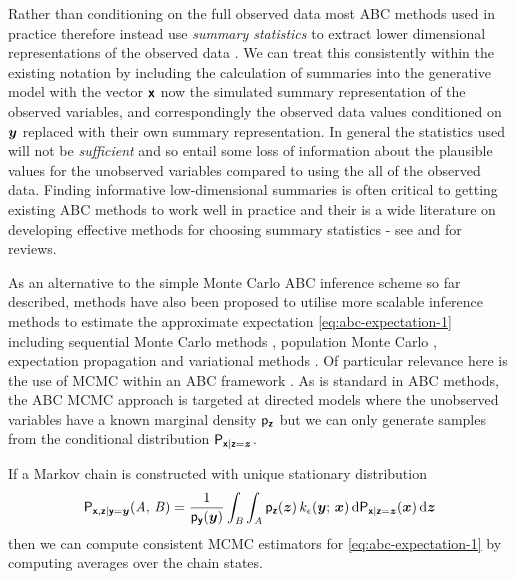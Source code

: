 Rather than conditioning on the full observed data most \ac{ABC} methods used in practice therefore instead use \emph{summary statistics} to extract lower dimensional representations of the observed data \citep{prangle2015summary}. We can treat this consistently within the existing notation by including the calculation of summaries into the generative model with the vector $\boldsymbol{\mathsf{x}}$ now the simulated summary representation of the observed variables, and correspondingly the observed data values conditioned on $\boldsymbol{y}$ replaced with their own summary representation. In general the statistics used will not be \emph{sufficient} and so entail some loss of information about the plausible values for the unobserved variables compared to using the all of the observed data. Finding informative low-dimensional summaries is often critical to getting existing \ac{ABC} methods to work well in practice and their is a wide literature on developing effective methods for choosing summary statistics - see \citep{prangle2015summary} and \citep{blum2013comparative} for reviews. %

As an alternative to the simple Monte Carlo \ac{ABC} inference scheme so far described, methods have also been proposed to utilise more scalable inference methods to estimate the approximate expectation \eqref{eq:abc-expectation-1} including sequential Monte Carlo methods \citep{sisson2007sequential,toni2009approximate}, population Monte Carlo \citep{beaumont2009adaptive}, expectation propagation \citep{barthelme2014expectation} and variational methods \citep{tran2017variational}. Of particular relevance here is the use of \ac{MCMC} within an \ac{ABC} framework \citep{marjoram2003markov,sisson2011likelihood}. As is standard in \ac{ABC} methods, the \ac{ABC} \ac{MCMC} approach is targeted at directed models where the unobserved variables have a known marginal density $\mathsf{p}_{\boldsymbol{\mathsf{z}}}$ but we can only generate samples from the conditional distribution $\mathsf{P}_{\boldsymbol{\mathsf{x}}|\boldsymbol{\mathsf{z}}=\boldsymbol{z}}$. 

If a Markov chain is constructed with unique stationary distribution
\begin{equation}\label{eq:abc-mcmc-target}
  \mathsf{P}_{\boldsymbol{\mathsf{x}},\boldsymbol{\mathsf{z}}|\boldsymbol{\mathsf{y}}=\boldsymbol{y}}(\mathit{A},\,\mathit{B}) =
  \frac{1}{\mathsf{p}_{\boldsymbol{\mathsf{y}}}(\boldsymbol{y})}
  \int_{\mathit{B}}\int_{\mathit{A}}
  \mathsf{p}_{\boldsymbol{\mathsf{z}}}(\boldsymbol{z})\,k_\epsilon(\boldsymbol{y};\,\boldsymbol{x})\,
  \mathrm{d}\mathsf{P}_{\boldsymbol{\mathsf{x}} | \boldsymbol{\mathsf{z}}=\boldsymbol{z}}(\boldsymbol{x})\,
  \mathrm{d}\boldsymbol{z}
\end{equation}
then we can compute consistent \ac{MCMC} estimators for \eqref{eq:abc-expectation-1} by computing averages over the chain states. 

